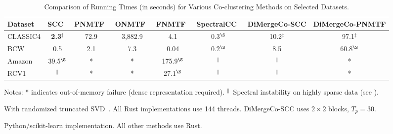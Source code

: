 \documentclass[journal]{IEEEtran}
\theoremstyle{definition}
\theoremstyle{remark} %
\renewcommand{\cite}[1]{~\autocite{#1}}
\begin{document}
\begin{table}[htbp]
    \centering
    \caption{Comparison of Running Times (in seconds) for Various Co-clustering Methods on Selected Datasets.}
    \label{tab:running-time}
    \begin{threeparttable}
        \begin{tabular}{@{} l ccccccc @{}}
            \toprule
            Dataset    & SCC\cite{dhillon2001CoclusteringDocumentsWords}
                       & PNMTF\cite{chen2023ParallelNonNegativeMatrix}
                       & ONMTF\cite{ding2006OrthogonalNonnegativeMatrix}
                       & FNMTF\cite{kim2011FastNonnegativeMatrix}
                       & SpectralCC\cite{sklearn2011}
                       & \textbf{DiMergeCo-SCC} & \textbf{DiMergeCo-PNMTF}                         \\
            \midrule
            CLASSIC4   & \textbf{2.3}$^{\ddagger}$ & 72.9  & 3,882.9 & 4.1   & 0.3$^{\S}$ & 10.2$^{\ddagger}$ & 97.1$^{\ddagger}$ \\
            BCW        & 0.5                       & 2.1   & 7.3     & 0.04  & 0.2$^{\S}$ & 8.5               & 60.8$^{\S}$    \\
            Amazon     & 39.5$^{\S}$               & *     & *       & 175.9$^{\S}$ & $^{\|}$  & $^{\|}$           & *              \\
            RCV1       & $^{\|}$                   & *     & *       & 27.1$^{\S}$  & $^{\|}$  & $^{\|}$           & *              \\
            \bottomrule
        \end{tabular}
        \begin{tablenotes}
            \small
            \item Notes: * indicates out-of-memory failure (dense representation required). $^{\|}$~Spectral instability on highly sparse data (see ).
            \item[$\ddagger$] With randomized truncated SVD\cite{halko2011FindingStructureRandomness}. All Rust implementations use 144 threads. DiMergeCo-SCC uses $2\times2$ blocks, $T_p=30$.
            \item[$\S$] Python/scikit-learn implementation. All other methods use Rust.
        \end{tablenotes}
    \end{threeparttable}
\end{table}
\end{document}
